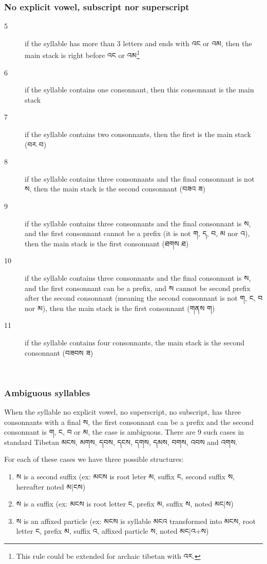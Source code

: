 \documentclass[%
a4paper,%
pagesize,%
12pt,%
parskip=off,%
bibliography=totoc,%
numbers=noenddot,%
DIV=12,%
twoside=semi,%
headings=normal%
]{scrartcl}
\begin{document}
\subsubsection*{No explicit vowel, subscript nor superscript}

\begin{description}
\item[5] if the syllable has more than 3 letters and ends with འང or འམ, then the main stack is right before འང or འམ\footnote{This rule could be extended for archaic tibetan with འར.}
\item[6] if the syllable contains one consonnant, then this consonnant is the main stack
\item[7] if the syllable contains two consonnants, then the first is the main stack (བར \rightarrow{} བ)
\item[8] if the syllable contains three consonnants and the final consonnant is not ས, then the main stack is the second consonnant (བཟའ \rightarrow{} ཟ)
\item[9] if the syllable contains three consonnants and the final consonnant is ས, and the first consonnant cannot be a prefix (it is not ག, ད, བ, མ nor འ), then the main stack is the first consonnant (ཐགས \rightarrow{} ཐ)
\item[10] if the syllable contains three consonnants and the final consonnant is ས, and the first consonnant can be a prefix, and ས cannot be second prefix after the second consonnant (meaning the second consonnant is not ག, ང, བ nor མ), then the main stack is the first consonnant (གནས \rightarrow{} ག)
\item[11] if the syllable contains four consonnants, the main stack is the second consonnant (བཟབས \rightarrow{} ཟ)
\end{description}

­\subsubsection*{Ambiguous syllables}

When the syllable no explicit vowel, no superscript, no subscript, has three consonnants with a final ས, the first consonnant can be a prefix and the second consonnant is ག, ང, བ or མ, the case is ambiguous. There are 9 such cases in standard Tibetan མངས, མགས, དབས, དངས, དགས, དམས, བགས, འབས and འགས.

For each of these cases we have three possible structures:
\begin{enumerate}
\item ས is a second suffix (ex: མངས is root leter མ, suffix ང, second suffix ས, hereafter noted མ|ངས)
\item ས is a suffix (ex: མངས is root letter ང, prefix མ, suffix ས, noted མང|ས)
\item ས is an affixed particle (ex: མངས is syllable མངའ transformed into མངས, root letter ང, prefix མ, suffix འ, affixed particle ས, noted མང|འ+ས)
\end{enumerate}
\end{document}
